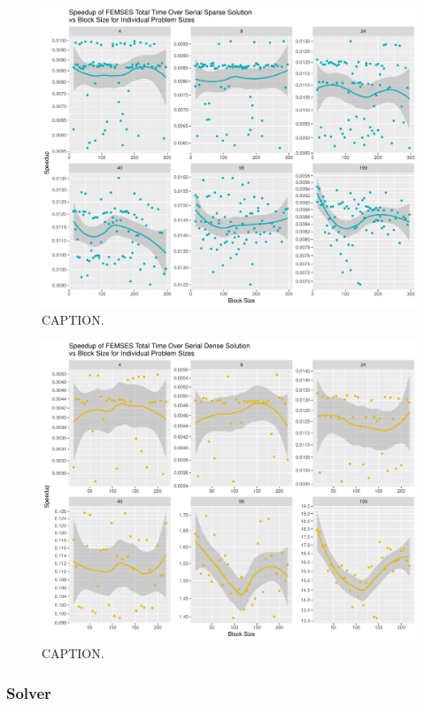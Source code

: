 \begin{figure}
	\centering
	\includegraphics[width=0.9\linewidth]{Plots/total_femses_cpu_sparse_speedup_vs_b_facet}
	\caption{CAPTION.}
	\label{fig:tot_femses_sparse_b}
\end{figure}
\begin{figure}
	\centering
	\includegraphics[width = 0.9\linewidth]{Plots/total_femses_cpu_dense_speedup_vs_b_facet}
	\caption{CAPTION.}
	\label{fig:tot_femses_dense_b}
\end{figure}

\subsubsection{Solver}

